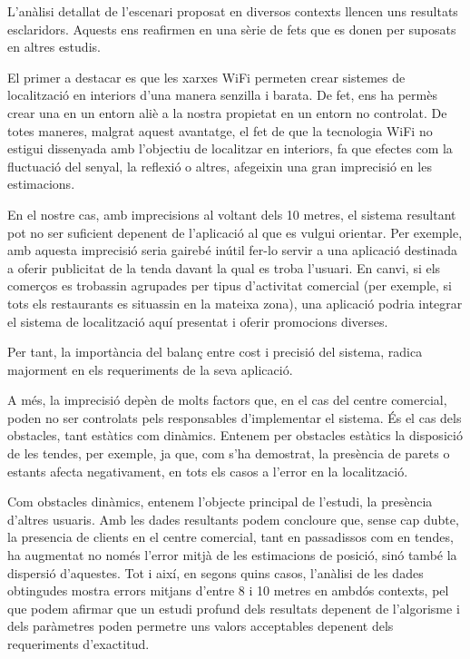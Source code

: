 
L'anàlisi detallat de l'escenari proposat en diversos contexts llencen uns resultats esclaridors. Aquests ens reafirmen en una sèrie de fets que es donen per suposats en altres estudis.

El primer a destacar es que les xarxes WiFi permeten crear sistemes de localització en interiors d'una manera senzilla i barata. De fet, ens ha permès crear una en un entorn aliè a la nostra propietat en un entorn no controlat. De totes maneres, malgrat aquest avantatge, el fet de que la tecnologia WiFi no estigui dissenyada amb l'objectiu de localitzar en interiors, fa que efectes com la fluctuació del senyal, la reflexió o altres, afegeixin una gran imprecisió en les estimacions.

En el nostre cas, amb imprecisions al voltant dels 10 metres, el sistema resultant pot no ser suficient depenent de l'aplicació al que es vulgui orientar. Per exemple, amb aquesta imprecisió seria gairebé inútil fer-lo servir a una aplicació destinada a oferir publicitat de la tenda davant la qual es troba l'usuari. En canvi, si els comerços es trobassin agrupades per tipus d'activitat comercial (per exemple, si tots els restaurants es situassin en la mateixa zona), una aplicació podria integrar el sistema de localització aquí presentat i oferir promocions diverses.

Per tant, la importància del balanç entre cost i precisió del sistema, radica majorment en els requeriments de la seva aplicació.

A més, la imprecisió depèn de molts factors que, en el cas del centre comercial, poden no ser controlats pels responsables d'implementar el sistema. És el cas dels obstacles, tant estàtics com dinàmics. Entenem per obstacles estàtics la disposició de les tendes, per exemple, ja que, com s'ha demostrat, la presència de parets o estants afecta negativament, en tots els casos a l'error en la localització.

Com obstacles dinàmics, entenem l'objecte principal de l'estudi, la presència d'altres usuaris. Amb les dades resultants podem concloure que, sense cap dubte, la presencia de clients en el centre comercial, tant en passadissos com en tendes, ha augmentat no només l'error mitjà de les estimacions de posició, sinó també la dispersió d'aquestes. Tot i així, en segons quins casos, l'anàlisi de les dades obtingudes mostra errors mitjans d'entre 8 i 10 metres en ambdós contexts, pel que podem afirmar que un estudi profund dels resultats depenent de l'algorisme i dels paràmetres poden permetre uns valors acceptables depenent dels requeriments d'exactitud.
